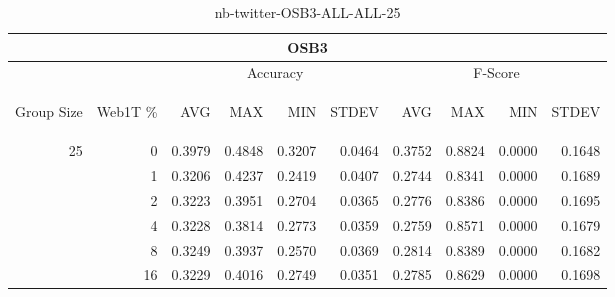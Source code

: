 \begin{center}
\begin{table}[htbp]
\begin{center}
\begin{tabular}{ | r | r | r | r | r | r | r | r | r | r |}
\hline
\multicolumn{10}{|c|}{OSB3}\\
\hline
 & & \multicolumn{4}{|c|}{Accuracy} & \multicolumn{4}{|c|}{F-Score}\\ \cline{3-10}
\begin{sideways}Group Size\end{sideways} & \begin{sideways}Web1T \%\end{sideways} & \begin{sideways}AVG\end{sideways} & \begin{sideways}MAX\end{sideways} & \begin{sideways}MIN\end{sideways} & \begin{sideways}STDEV\end{sideways} & \begin{sideways}AVG\end{sideways} & \begin{sideways}MAX\end{sideways} & \begin{sideways}MIN\end{sideways} & \begin{sideways}STDEV\end{sideways}\\
\hline
\multirow{5}{*}{25}
 & 0 & 0.3979 & 0.4848 & 0.3207 & 0.0464 & 0.3752 & 0.8824 & 0.0000 & 0.1648\\ \cline{2-10}
 & 1 & 0.3206 & 0.4237 & 0.2419 & 0.0407 & 0.2744 & 0.8341 & 0.0000 & 0.1689\\ \cline{2-10}
 & 2 & 0.3223 & 0.3951 & 0.2704 & 0.0365 & 0.2776 & 0.8386 & 0.0000 & 0.1695\\ \cline{2-10}
 & 4 & 0.3228 & 0.3814 & 0.2773 & 0.0359 & 0.2759 & 0.8571 & 0.0000 & 0.1679\\ \cline{2-10}
 & 8 & 0.3249 & 0.3937 & 0.2570 & 0.0369 & 0.2814 & 0.8389 & 0.0000 & 0.1682\\ \cline{2-10}
 & 16 & 0.3229 & 0.4016 & 0.2749 & 0.0351 & 0.2785 & 0.8629 & 0.0000 & 0.1698\\ \cline{2-10}
\hline
\end{tabular}
\caption{nb-twitter-OSB3-ALL-ALL-25}
\label{table:nb-twitter-OSB3-ALL-ALL-25}
\end{center}
\end{table}
\end{center}

